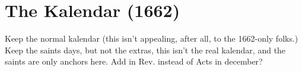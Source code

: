 \chapter{The Kalendar (1662)}

Keep the normal kalendar (this isn't appealing, after all, to the 1662-only folks.)
Keep the saints days, but not the extras, this isn't the real kalendar, and the saints
are only anchors here.
Add in Rev. instead of Acts in december?

